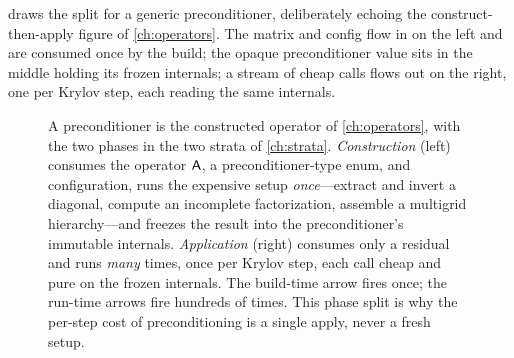  draws the split for a generic preconditioner, deliberately echoing
the construct-then-apply figure of \cref{ch:operators}. The matrix and config flow in on
the left and are consumed once by the build; the opaque preconditioner value sits in the
middle holding its frozen internals; a stream of cheap  calls flows out on
the right, one per Krylov step, each reading the same internals.

\begin{figure}[t]
\centering
{}
\caption[Build once, apply each step]{A preconditioner is the constructed operator of
\cref{ch:operators}, with the two phases in the two strata of \cref{ch:strata}.
\emph{Construction} (left) consumes the operator $\mathsf{A}$, a preconditioner-type enum,
and configuration, runs the expensive setup \emph{once}---extract and invert a diagonal,
compute an incomplete factorization, assemble a multigrid hierarchy---and freezes the
result into the preconditioner's immutable internals. \emph{Application} (right) consumes
only a residual and runs \emph{many} times, once per Krylov step, each call cheap and pure
on the frozen internals. The build-time arrow fires once; the run-time arrows fire
hundreds of times. This phase split is why the per-step cost of preconditioning is a
single apply, never a fresh setup.}
\label{fig:build-apply}
\end{figure}

